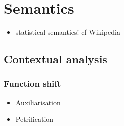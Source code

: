 \chapter{Semantics}
\label{chp:semantics}
\minitoc\mtcskip
\begin{itemize}
	\item statistical semantics! cf Wikipedia
\end{itemize}
\section{Contextual analysis}
\label{sect:contextualanalysis}
\subsection{Function shift}
\label{subsect:functionshift}
\begin{itemize}
	\item Auxiliarisation
	\item Petrification
\end{itemize}